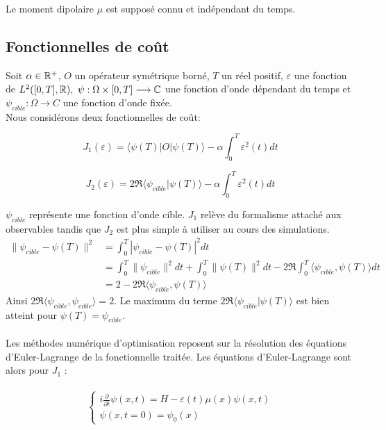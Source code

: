 Le moment dipolaire $\mu$ est supposé connu et indépendant du temps.

\subsection{Fonctionnelles de coût}
Soit $\alpha \in \mathbb R^+$, $O$ un opérateur symétrique borné, $T$ un réel positif, $\varepsilon$ une fonction de $L^2 ([0, T ], \mathbb R),\  \psi : \Omega \times [0, T ] \longrightarrow \mathbb C$ une fonction d’onde dépendant du temps et $\psi_{cible} : \Omega \longrightarrow C$ une fonction d’onde fixée.
\\Nous considérons deux fonctionnelles de coût:

\begin{equation}
J_1(\varepsilon) = \langle \psi(T)|O|\psi(T) \rangle - \alpha \int_0^T \varepsilon^2(t)dt
\end{equation}

\begin{equation}
J_2(\varepsilon) = 2\Re\langle \psi_{cible}|\psi(T)\rangle - \alpha \int_0^T \varepsilon^2(t)dt
\end{equation}

$\psi_{cible}$ représente une fonction d’onde cible. $J_1$ relève du formalisme attaché aux observables tandis que $J_2$ est plus simple à utiliser au cours des simulations.
\begin{align*}
\lVert \psi_{cible} - \psi(T)\rVert^2 &= \int_{0}^{T} |\psi_{cible}-\psi(T)|^2 dt\\
&=\int_{0}^{T}\lVert \psi_{cible} \rVert^2 dt + \int_{0}^{T}\lVert \psi(T) \rVert^2 dt - 2\Re \int_{0}^{T} \langle \psi_{cible},\psi(T) \rangle dt \\
&= 2 - 2\Re\langle \psi_{cible}, \psi(T) \rangle
\end{align*}
Ainsi $2\Re \langle \psi_{cible},\psi_{cible} \rangle = 2$. Le maximum du terme $2\Re\langle \psi_{cible}|\psi(T)\rangle$ est bien atteint pour $\psi(T) = \psi_{cible}$.\\\\
Les méthodes numérique d’optimisation reposent sur la résolution des équations d’Euler-Lagrange de la fonctionnelle traitée. Les équations d'Euler-Lagrange sont alors pour $J_1$ :\\\\

\begin{equation}
\begin{cases}
i \frac{\partial}{\partial t} \psi (x,t) = H - \varepsilon(t)\mu(x)\psi(x,t)\\
\psi(x,t=0)=\psi_0(x)
\end{cases}
\end{equation}

